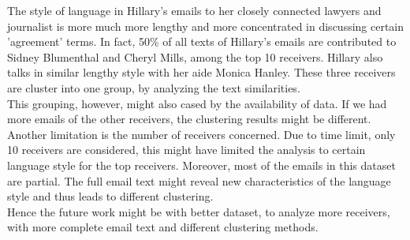The style of language in Hillary's emails to her closely connected lawyers and journalist is more much more lengthy and more concentrated in discussing certain 'agreement' terms. In fact, 50\% of all texts of Hillary's emails are contributed to Sidney Blumenthal and Cheryl Mills, among the top 10 receivers. Hillary also talks in similar lengthy style with her aide Monica Hanley. These three receivers are cluster into one group, by analyzing the text similarities. 
\\
This grouping, however, might also cased by the availability of data. If we had more emails of the other receivers, the clustering results might be different. Another limitation is the number of receivers concerned. Due to time limit, only 10 receivers are considered, this might have limited the analysis to certain language style for the top receivers. Moreover, most of the emails in this dataset are partial. The full email text might reveal new characteristics of the language style and thus leads to different clustering. \\
Hence the future work might be with better dataset, to analyze more receivers, with more complete email text and different clustering methods.